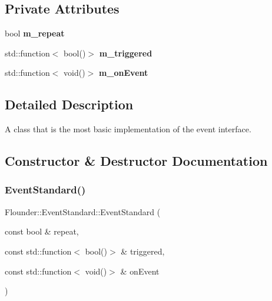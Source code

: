 \subsection*{Private Attributes}
\begin{DoxyCompactItemize}
\item 
\mbox{\label{class_flounder_1_1_event_standard_a1cdaba2288fef644bdb68427c595e8d7}} 
bool {\bfseries m\+\_\+repeat}
\item 
\mbox{\label{class_flounder_1_1_event_standard_a31809e724d2dd6eb605df5a95262275f}} 
std\+::function$<$ bool()$>$ {\bfseries m\+\_\+triggered}
\item 
\mbox{\label{class_flounder_1_1_event_standard_a4f238a5ec6adbfc61ba952a3dda8182d}} 
std\+::function$<$ void()$>$ {\bfseries m\+\_\+on\+Event}
\end{DoxyCompactItemize}


\subsection{Detailed Description}
A class that is the most basic implementation of the event interface. 



\subsection{Constructor \& Destructor Documentation}
\mbox{\label{class_flounder_1_1_event_standard_a1e03e7d6c820244aa01315592fbb56cb}} 
\subsubsection{\texorpdfstring{Event\+Standard()}{EventStandard()}\hspace{0.1cm}{\footnotesize\ttfamily [1/2]}}
{\footnotesize\ttfamily Flounder\+::\+Event\+Standard\+::\+Event\+Standard (\begin{DoxyParamCaption}\item[{const bool \&}]{repeat,  }\item[{const std\+::function$<$ bool()$>$ \&}]{triggered,  }\item[{const std\+::function$<$ void()$>$ \&}]{on\+Event }\end{DoxyParamCaption})}



